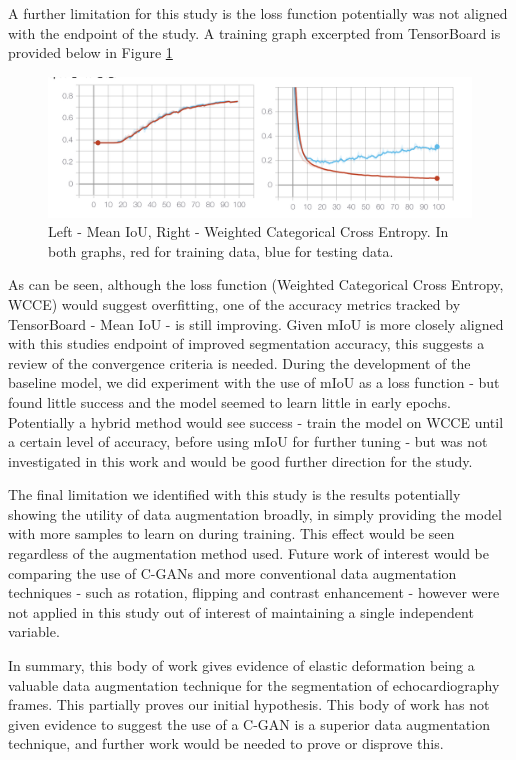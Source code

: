 A further limitation for this study is the loss function potentially was
not aligned with the endpoint of the study. A training graph excerpted from
TensorBoard is provided below in Figure \ref{fig:tboard}

\begin{figure}[H]
    \centering
    \includegraphics[width=1.0\textwidth]{figures/train.png}
    \caption{Left - Mean IoU, Right - Weighted Categorical Cross Entropy. In both graphs, red for training data, blue for testing data.}
    \label{fig:tboard}
\end{figure}

As can be seen, although the loss function (Weighted Categorical Cross Entropy,
WCCE) would suggest overfitting, one of the accuracy metrics tracked by
TensorBoard - Mean IoU - is still improving. Given mIoU is more closely aligned
with this studies endpoint of improved segmentation accuracy, this suggests a
review of the convergence criteria is needed. During the development of the
baseline model, we did experiment with the use of mIoU as a loss function - but
found little success and the model seemed to learn little in early epochs.
Potentially a hybrid method would see success - train the model on WCCE until a
certain level of accuracy, before using mIoU for further tuning - but was not
investigated in this work and would be good further direction for the study.
\newline

The final limitation we identified with this study is the results potentially
showing the utility of data augmentation broadly, in simply providing the model
with more samples to learn on during training. This effect would be seen
regardless of the augmentation method used. Future work of interest would be
comparing the use of C-GANs and more conventional data augmentation techniques -
such as rotation, flipping and contrast enhancement - however were not applied
in this study out of interest of maintaining a single independent variable.
\newline

In summary, this body of work gives evidence of elastic deformation being a valuable
data augmentation technique for the segmentation of echocardiography frames.
This partially proves our initial hypothesis. This body of work has not given
evidence to suggest the use of a C-GAN is a superior data augmentation
technique, and further work would be needed to prove or disprove this. \newline